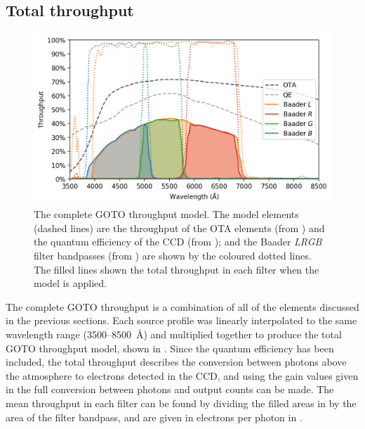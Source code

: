 \begin{colsection}
\begin{colsection}
\end{colsection}

\newpage
\subsection{Total throughput}
\label{sec:total_throughput}
\begin{colsection}

\begin{figure}[t]
    \begin{center}
        \includegraphics[width=\textwidth]{images/throughput/throughput.png}
    \end{center}
    \caption[Complete throughput model for the GOTO filters]{
        The complete GOTO throughput model. The model elements (dashed lines) are the throughput of the OTA elements (from ) and the quantum efficiency of the CCD (from ); and the Baader \textit{LRGB} filter bandpasses (from ) are shown by the coloured dotted lines. The filled lines shown the total throughput in each filter when the model is applied.
    }\label{fig:throughput}
\end{figure}

The complete GOTO throughput is a combination of all of the elements discussed in the previous sections. Each source profile was linearly interpolated to the same wavelength range (3500--\SI{8500}{\angstrom}) and multiplied together to produce the total GOTO throughput model, shown in . Since the quantum efficiency has been included, the total throughput describes the conversion between photons above the atmosphere to electrons detected in the CCD, and using the gain values given in  the full conversion between photons and output counts can be made. The mean throughput in each filter can be found by dividing the filled areas in  by the area of the filter bandpass, and are given in electrons per photon in .


\end{colsection}
\end{colsection}
